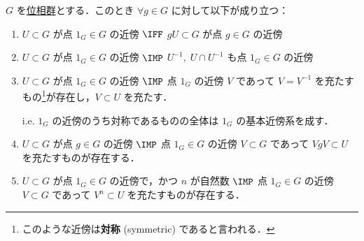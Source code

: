 \documentclass[algtopo_main]{subfiles}
\begin{document}
\begin{mylem}[label=lem:TG-neighbor-basic]{}
    $G$ を\hyperref[def:TG]{位相群}とする．このとき $\forall g \in G$ に対して以下が成り立つ：
    \begin{enumerate}
        \item $U \subset G$ が点 $1_G \in G$ の近傍 $\IFF$ $gU \subset G$ が点 $g \in G$ の近傍
        \item $U \subset G$ が点 $1_G \in G$ の近傍 $\IMP$ $U^{-1},\; U \cap U^{-1}$ も点 $1_G \in G$ の近傍
        \item $U \subset G$ が点 $1_G \in G$ の近傍 $\IMP$ 点 $1_G$ の近傍 $V$ であって $V = V^{-1}$ を充たすもの\footnote{このような近傍は\textbf{対称} (symmetric) であると言われる．}が存在し，$V \subset U$ を充たす．
        
        i.e. $1_G$ の近傍のうち対称であるものの全体は $1_G$ の基本近傍系を成す．
        \item $U \subset G$ が点 $g \in G$ の近傍 $\IMP$ 点 $1_G \in G$ の近傍 $V \subset G$ であって $VgV \subset U$ を充たすものが存在する．
        \item $U \subset G$ が点 $1_G \in G$ の近傍で，かつ $n$ が自然数 $\IMP$ 点 $1_G \in G$ の近傍 $V \subset G$ であって $V^n \subset U$ を充たすものが存在する．
    \end{enumerate}
\end{mylem}
\end{document}
